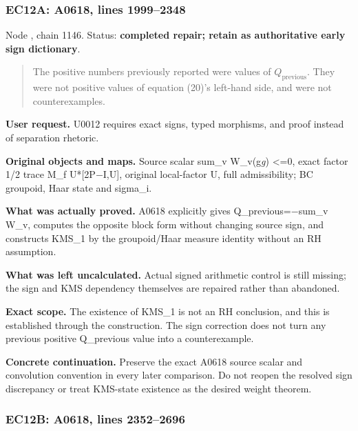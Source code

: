 \subsubsection{EC12A: A0618, lines
1999--2348}\label{TranscriptLedgerStage:ec12a-a0618-lines-19992348}

Node \protect{}, chain 1146.
Status: \textbf{completed repair; retain as authoritative early sign
dictionary}.

\begin{quote}
The positive numbers previously reported were values of
\(Q_{\mathrm{previous}}\). They were not positive values of equation
(20)'s left-hand side, and were not counterexamples.
\end{quote}

\textbf{User request.} U0012 requires exact signs, typed morphisms, and
proof instead of separation rhetoric.

\textbf{Original objects and maps.} Source scalar sum\_v W\_v(g\emph{g})
\textless=0, exact factor 1/2 trace M\_f
U*[2P\allowbreak{}\ensuremath{−}\allowbreak{}I,U], original local-factor
U, full admissibility; BC groupoid, Haar state and sigma\_i.

\textbf{What was actually proved.} A0618 explicitly gives
Q\_previous=\allowbreak{}\ensuremath{−}\allowbreak{}sum\_v W\_v,
computes the opposite block form without changing source sign, and
constructs KMS\_1 by the groupoid/Haar measure identity without an RH
assumption.

\textbf{What was left uncalculated.} Actual signed arithmetic control is
still missing; the sign and KMS dependency themselves are repaired
rather than abandoned.

\textbf{Exact scope.} The existence of KMS\_1 is not an RH conclusion,
and this is established through the construction. The sign correction
does not turn any previous positive Q\_previous value into a
counterexample.

\textbf{Concrete continuation.} Preserve the exact A0618 source scalar
and convolution convention in every later comparison. Do not reopen the
resolved sign discrepancy or treat KMS-state existence as the desired
weight theorem.

\subsubsection{EC12B: A0618, lines
2352--2696}\label{TranscriptLedgerStage:ec12b-a0618-lines-23522696}

